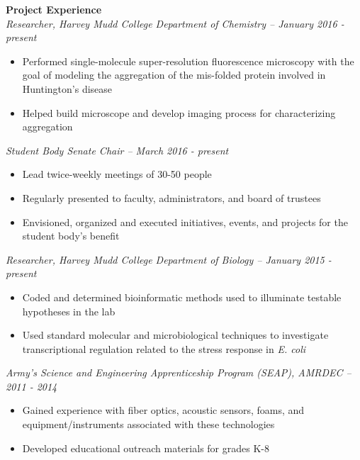 \documentclass[9pt]{article}
\begin{document}
\noindent
{\bf Project Experience \\}
{\it Researcher, Harvey Mudd College Department of Chemistry \--- January 2016 - present}
	\vspace{-2.5mm}
	\begin{itemize}[leftmargin=3.75mm]
		\setlength{\itemsep}{0pt}
    	\setlength{\parskip}{0pt}
    	\setlength{\parsep}{0pt}
		\item Performed single-molecule super-resolution fluorescence 			microscopy with the goal of modeling the aggregation of the mis-folded protein involved in	Huntington's disease
		\item Helped build microscope and develop imaging process for 			characterizing aggregation
	\end{itemize}
\vspace{-1mm}
{\it Student Body Senate Chair \--- March 2016 - present}
	\vspace{-2.5mm}
	\begin{itemize}[leftmargin=3.75mm]
		\setlength{\itemsep}{0pt}
    	\setlength{\parskip}{0pt}
    	\setlength{\parsep}{0pt}
		\item Lead twice-weekly meetings of 30-50 people
		\item Regularly presented to faculty, administrators, and board 		of trustees
		\item Envisioned, organized and executed initiatives, events, 			and	projects for the student body's benefit
	\end{itemize}
\vspace{-1mm}
{\it Researcher, Harvey Mudd College Department of Biology \--- January 2015 - present}
	\vspace{-2.5mm}
	\begin{itemize}[leftmargin=3.75mm]
		\setlength{\itemsep}{0pt}
    	\setlength{\parskip}{0pt}
    	\setlength{\parsep}{0pt}
		\item Coded and determined bioinformatic methods used to 				illuminate testable hypotheses in the  lab
		\item Used standard molecular and microbiological techniques to 		investigate transcriptional regulation related to the stress 			response in {\it E. coli} 
	\end{itemize}
\vspace{-1mm}
{\it Army's Science and Engineering Apprenticeship Program (SEAP), AMRDEC  \--- 2011 - 2014}
	\vspace{-2.5mm}
	\begin{itemize}[leftmargin=3.75mm]
		\setlength{\itemsep}{0pt}
    	\setlength{\parskip}{0pt}
    	\setlength{\parsep}{0pt}
		\item Gained experience with fiber optics, acoustic sensors, 			foams, and equipment/instruments associated with these 					technologies
		\item Developed educational outreach materials for grades K-8 
	\end{itemize}
\end{document}
